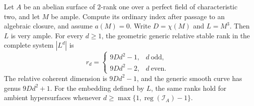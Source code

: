 \begin{theorem}
\label{thm:DE-A3-mixed-nonproduct-ranks}
Let $A$ be an abelian surface of $2$-rank one over a perfect field
of characteristic two, and let $M$ be ample.  Compute its ordinary
index after passage to an algebraic closure, and assume $a(M)=0$.
Write $D=\chi(M)$ and $L=M^3$.  Then $L$ is very ample.
For every $d\ge1$, the geometric generic relative stable rank
in the complete system $|L^d|$ is
\[
 r_d=
 \begin{cases}
       9Dd^2-1,&d\ \text{odd},\\
       9Dd^2-2,&d\ \text{even}.
 \end{cases}
\]
The relative coherent dimension is $9Dd^2-1$, and the generic
smooth curve has genus $9Dd^2+1$.  For the embedding defined by $L$,
the same ranks hold for ambient hypersurfaces whenever
$d\ge\max\{1,\operatorname{reg}(\mathcal I_A)-1\}$.
\end{theorem}

